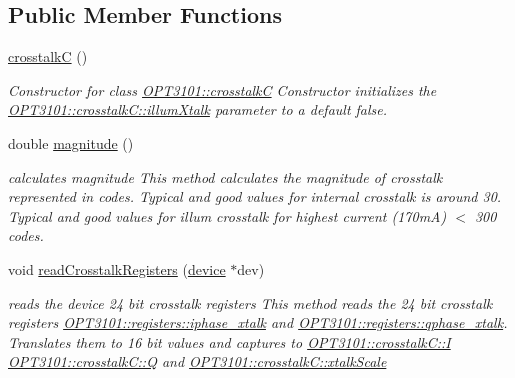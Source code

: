 \subsection*{Public Member Functions}
\begin{DoxyCompactItemize}
\item 
\mbox{\hyperlink{class_o_p_t3101_1_1crosstalk_c_a2b568d4391bfb9a92bbe74e88140bec0}{crosstalkC}} ()
\begin{DoxyCompactList}\small\item\em Constructor for class \mbox{\hyperlink{class_o_p_t3101_1_1crosstalk_c}{O\+P\+T3101\+::crosstalkC}} Constructor initializes the \mbox{\hyperlink{class_o_p_t3101_1_1crosstalk_c_a74d3bfbfb7da65511d2d16e1b66a7098}{O\+P\+T3101\+::crosstalk\+C\+::illum\+Xtalk}} parameter to a default false. \end{DoxyCompactList}\item 
double \mbox{\hyperlink{class_o_p_t3101_1_1crosstalk_c_a3f569027c07fb3fb49a02ae3108e34c1}{magnitude}} ()
\begin{DoxyCompactList}\small\item\em calculates magnitude This method calculates the magnitude of crosstalk represented in codes. Typical and good values for internal crosstalk is around 30. Typical and good values for illum crosstalk for highest current (170mA) $<$ 300 codes. \end{DoxyCompactList}\item 
void \mbox{\hyperlink{class_o_p_t3101_1_1crosstalk_c_acdfb870a70a6bc565d3a190fa459eeab}{read\+Crosstalk\+Registers}} (\mbox{\hyperlink{class_o_p_t3101_1_1device}{device}} $\ast$dev)
\begin{DoxyCompactList}\small\item\em reads the device 24 bit crosstalk registers This method reads the 24 bit crosstalk registers \mbox{\hyperlink{class_o_p_t3101_1_1registers_ae87864da6c35bed7c34ebf5f26ba4513}{O\+P\+T3101\+::registers\+::iphase\+\_\+xtalk}} and \mbox{\hyperlink{class_o_p_t3101_1_1registers_ad94d98dfb26313a9d32c5c2c0c673693}{O\+P\+T3101\+::registers\+::qphase\+\_\+xtalk}}. Translates them to 16 bit values and captures to \mbox{\hyperlink{class_o_p_t3101_1_1crosstalk_c_a97152b209288a0dc30c4158fdc1815fc}{O\+P\+T3101\+::crosstalk\+C\+::I}} \mbox{\hyperlink{class_o_p_t3101_1_1crosstalk_c_a1e20d913baf2432ec90fe06a45c226db}{O\+P\+T3101\+::crosstalk\+C\+::Q}} and \mbox{\hyperlink{class_o_p_t3101_1_1crosstalk_c_a5a5c560e1f5db427c02863a9618d9fa4}{O\+P\+T3101\+::crosstalk\+C\+::xtalk\+Scale}} \end{DoxyCompactList}\item 

\end{DoxyCompactItemize}
